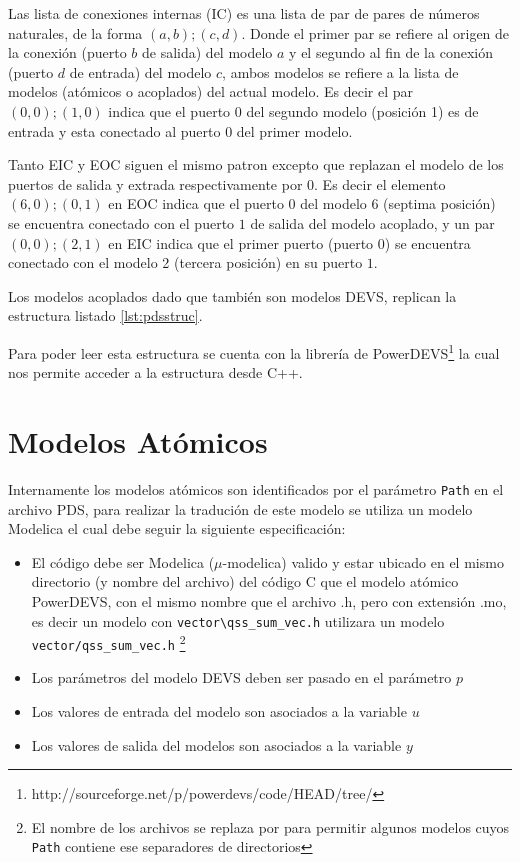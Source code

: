         Las lista de conexiones internas (IC) es una lista de par de pares de números naturales, de la forma $(a,b);(c,d)$.
        Donde el primer par se refiere al origen de la conexión (puerto $b$ de salida) del modelo $a$ y el segundo al fin de la conexión (puerto $d$ de entrada) 
        del modelo $c$, ambos modelos se refiere a la lista de modelos (atómicos o acoplados) del actual modelo.
        Es decir el par $(0,0);(1,0)$ indica que el puerto $0$ del segundo modelo (posición 1) es de entrada  y esta conectado al puerto $0$ del primer modelo.

        Tanto EIC y EOC siguen el mismo patron excepto que replazan el modelo de los puertos de salida y extrada respectivamente por $0$. Es decir el elemento 
        $(6,0);(0,1)$ en EOC indica que el puerto $0$ del modelo $6$ (septima posición)  se encuentra conectado con el puerto $1$ de salida del modelo 
        acoplado, y un par $(0,0);(2,1)$ en EIC indica que el primer puerto (puerto $0$) se encuentra conectado con el modelo 2 (tercera posición) en su puerto $1$.

        Los modelos acoplados dado que también son modelos DEVS, replican la estructura listado \ref{lst:pdsstruc}.

        Para poder leer esta estructura se cuenta con la librería de PowerDEVS\footnote{http://sourceforge.net/p/powerdevs/code/HEAD/tree/} la cual nos permite acceder
        a la estructura desde C++. 

\section{Modelos Atómicos}
        
        Internamente los modelos atómicos son identificados por el parámetro \texttt{Path} en el archivo PDS, para realizar la tradución de este modelo se utiliza 
        un modelo Modelica el cual debe seguir la siguiente especificación:

\begin{itemize}
        \item El código debe ser Modelica ($\mu$-modelica) valido y estar ubicado en el mismo directorio (y nombre del archivo) del código C que el modelo atómico 
        PowerDEVS, con el mismo nombre que el archivo .h, pero con extensión .mo, es decir un modelo con \texttt{vector\textbackslash qss\_sum\_vec.h} utilizara un modelo 
        \texttt{vector/qss\_sum\_vec.h} \footnote{El nombre de los archivos se replaza \quotes{\textbackslash} por \quotes{/} para permitir algunos modelos 
        cuyos \texttt{Path} contiene ese separadores de directorios}
        \item Los parámetros del modelo DEVS deben ser pasado en el parámetro $p$
        \item Los valores de entrada del modelo son asociados a la variable $u$
        \item Los valores de salida del modelos son asociados a la variable $y$
\end{itemize}

